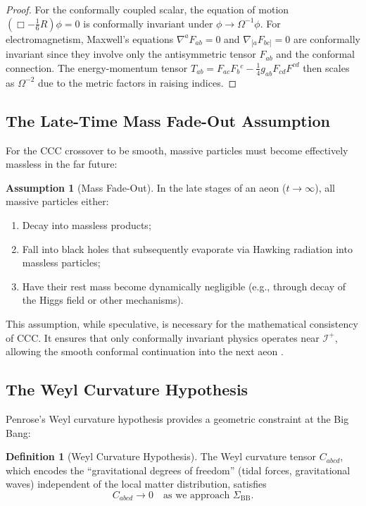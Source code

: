 \documentclass[11pt,a4paper]{article}
\theoremstyle{plain}
\theoremstyle{definition}
\newtheorem{definition}[theorem]{Definition}
\newtheorem{assumption}[theorem]{Assumption}
\theoremstyle{remark}
\newcommand{\scriplus}{\mathcal{I}^+}
\newcommand{\sigmabb}{\Sigma_{\mathrm{BB}}}
\begin{document}
\begin{proof}
For the conformally coupled scalar, the equation of motion $(\Box - \frac{1}{6}R)\phi = 0$ is conformally invariant under $\phi \to \Omega^{-1}\phi$. For electromagnetism, Maxwell's equations $\nabla^a F_{ab} = 0$ and $\nabla_{[a}F_{bc]} = 0$ are conformally invariant since they involve only the antisymmetric tensor $F_{ab}$ and the conformal connection. The energy-momentum tensor $T_{ab} = F_{ac}F_b{}^c - \frac{1}{4}g_{ab}F_{cd}F^{cd}$ then scales as $\Omega^{-2}$ due to the metric factors in raising indices.
\end{proof}

\subsection{The Late-Time Mass Fade-Out Assumption}

For the CCC crossover to be smooth, massive particles must become effectively massless in the far future:

\begin{assumption}[Mass Fade-Out]\label{ass:mass_fadeout}
In the late stages of an aeon ($t \to \infty$), all massive particles either:
\begin{enumerate}
    \item Decay into massless products;
    \item Fall into black holes that subsequently evaporate via Hawking radiation into massless particles;
    \item Have their rest mass become dynamically negligible (e.g., through decay of the Higgs field or other mechanisms).
\end{enumerate}
\end{assumption}

This assumption, while speculative, is necessary for the mathematical consistency of CCC. It ensures that only conformally invariant physics operates near $\scriplus$, allowing the smooth conformal continuation into the next aeon \cite{ccc_wiki,penrose_cycles}.

\subsection{The Weyl Curvature Hypothesis}

Penrose's Weyl curvature hypothesis provides a geometric constraint at the Big Bang:

\begin{definition}[Weyl Curvature Hypothesis]\label{def:weyl_hypothesis}
The Weyl curvature tensor $C_{abcd}$, which encodes the ``gravitational degrees of freedom'' (tidal forces, gravitational waves) independent of the local matter distribution, satisfies
\begin{equation}\label{eq:weyl_vanishes}
    C_{abcd} \to 0 \quad \text{as we approach } \sigmabb.
\end{equation}
\end{definition}
\end{document}
